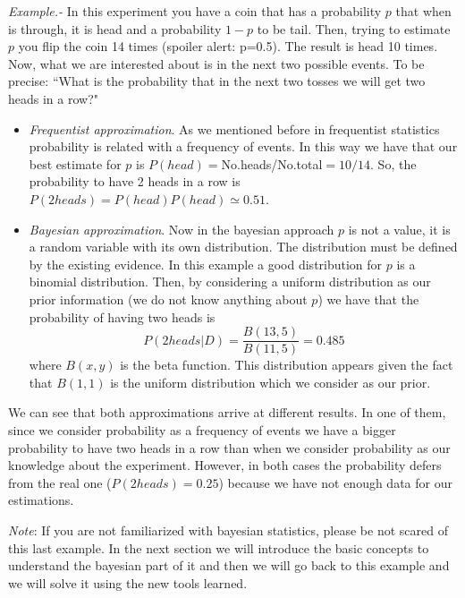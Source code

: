 \documentclass[onecolumn,           %
               showpacs,            %
               preprintnumbers,     %
               aps,                 %
               prl,          	    %
               letterpaper,             %
               superscriptaddress,      %
               nofootinbib,         %
               tightenlines,        %
               floats,floatfix      %
               ,usenatbib,
               ]{revtex4-1}
\begin{document}
\textit{Example.-} In this experiment  you have a coin that has a probability $p$ that when is through, it is head and a probability $1-p$ to be tail. Then, trying to estimate $p$ you flip the coin 14 times (spoiler alert: p=0.5). The result is head 10 times. Now, what we are interested about is in the next two possible events. To be precise: ``What is the probability that in the next two tosses we will get two heads in a row?"
\begin{itemize}
\item \textit{Frequentist approximation}. As we mentioned before in frequentist statistics probability is related with a frequency of events. In this way we have that our best estimate for $p$ is $P(head)=$No.heads/No.total$=10/14$. So, the probability to have 2 heads in a row is $P(2heads)=P(head)P(head)\simeq 0.51$.  
\item \textit{Bayesian approximation}. Now in the bayesian approach $p$ is not a value, it is a random variable with its own distribution. The distribution must be defined by the existing evidence. In this example a good distribution for $p$ is a binomial distribution. Then, by considering a uniform distribution as our prior information (we do not know anything about $p$) we have that the probability of having two heads is
\[
P(2heads|D)=\frac{B(13,5)}{B(11,5)}=0.485
\]
where $B(x,y)$ is the beta function. This distribution appears given the fact that $B(1,1)$ is the uniform distribution which we consider as our prior.
\end{itemize}

We can see that both approximations arrive at different results. In one of them, since we consider probability as a frequency of events we have a bigger probability to have two heads in a row than when we consider probability as our knowledge about the experiment. However, in both cases the probability defers from the real one ($P(2heads)=0.25$) because we have not enough data for our estimations.

\textit{Note}: If you are not familiarized with bayesian statistics,  please be not scared of this last example. In the next section we will introduce the basic concepts to understand the bayesian part of it and then we will go back to this example and we will solve it using the new tools learned.   

\end{document}
